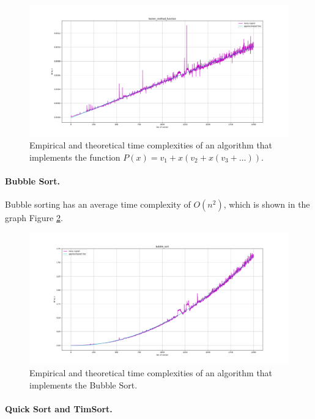 \begin{figure}[H]
    \center
    \includegraphics[width=\textwidth]{img/horner_method_function.png}
    \caption{Empirical and theoretical time complexities of an algorithm that implements the function $P(x) = v_1 + x(v_2 + x(v_3 + ...))$.}
    \label{ris:horner_method_function}
\end{figure}

\paragraph{Bubble Sort.}

Bubble sorting has an average time complexity of $O(n^2)$, which is shown in the graph Figure \ref{ris:bubble_sort}.

\begin{figure}[H]
    \center
    \includegraphics[width=\textwidth]{img/bubble_sort.png}
    \caption{Empirical and theoretical time complexities of an algorithm that implements the Bubble Sort.}
    \label{ris:bubble_sort}
\end{figure}

\paragraph{Quick Sort and TimSort.}

